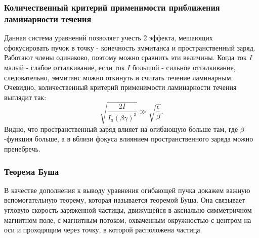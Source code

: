\documentclass[11pt]{article}
\begin{document}
    \hypertarget{ux43aux43eux43bux438ux447ux435ux441ux442ux432ux435ux43dux43dux44bux439-ux43aux440ux438ux442ux435ux440ux438ux439-ux43fux440ux438ux43cux435ux43dux438ux43cux43eux441ux442ux438-ux43fux440ux438ux431ux43bux438ux436ux435ux43dux438ux44f-ux43bux430ux43cux438ux43dux430ux440ux43dux43eux441ux442ux438-ux442ux435ux447ux435ux43dux438ux44f}{%
\subsubsection{Количественный критерий применимости приближения
ламинарности
течения}\label{ux43aux43eux43bux438ux447ux435ux441ux442ux432ux435ux43dux43dux44bux439-ux43aux440ux438ux442ux435ux440ux438ux439-ux43fux440ux438ux43cux435ux43dux438ux43cux43eux441ux442ux438-ux43fux440ux438ux431ux43bux438ux436ux435ux43dux438ux44f-ux43bux430ux43cux438ux43dux430ux440ux43dux43eux441ux442ux438-ux442ux435ux447ux435ux43dux438ux44f}}

    Данная система уравнений позволяет учесть 2 эффекта, мешающих
сфокусировать пучок в точку - конечность эммитанса и пространственный
заряд. Работают члены одинаково, поэтому можно сравнить эти величины.
Когда ток \(I\) малый - слабое отталкивание, если ток \(I\) большой -
сильное отталкивание, следовательно, эммитанс можно откинуть и считать
течение ламинарным. Очевидно, количественный критерий применимости
ламинарности течения выглядит так: \[
\displaystyle \sqrt{\frac{2I}{I_a(\beta\gamma)^3}} \gg \sqrt{\frac{\epsilon}{\beta}}.
\] Видно, что пространственный заряд влияет на огибающую больше там, где
\(\beta\)-функция больше, а в вблизи фокуса влиянием пространственного
заряда можно пренебречь.

    \hypertarget{ux442ux435ux43eux440ux435ux43cux430-ux431ux443ux448ux430}{%
\subsubsection{Теорема
Буша}\label{ux442ux435ux43eux440ux435ux43cux430-ux431ux443ux448ux430}}

    В качестве дополнения к выводу уравнения огибающей пучка докажем важную
вспомогательную теорему, которая называется теоремой Буша. Она связывает
угловую скорость заряженной частицы, движущейся в аксиально-симметричном
магнитном поле, с магнитным потоком, охваченным окружностью с центром на
оси и проходящим через точку, в которой расположена частица.
\end{document}
